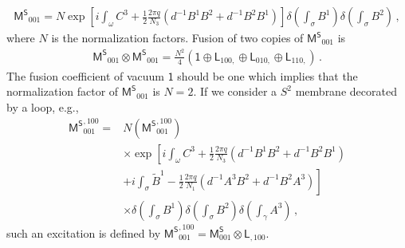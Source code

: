 \documentclass[11pt,nofootinbib,preprint]{revtex4-1}
\begin{document}
%
\begin{gather}
	\mathsf{M^S}_{001}=N\exp \left[ i\int_{\omega}{C^3+\frac{1}{2}\frac{2\pi q}{N_3}\left( d^{-1}B^1B^2+d^{-1}B^2B^1 \right)} \right] \delta \left( \int_{\sigma}{B^1} \right) \delta \left( \int_{\sigma}{B^2} \right) \,,
\end{gather}
where $N$ is the normalization factors. Fusion of two copies of $\mathsf{M^S}_{001}$ is 
\begin{align}
	{\mathsf{M}^{\mathsf{S}}}_{001}\otimes {\mathsf{M}^{\mathsf{S}}}_{001}=\frac{N^2}{4} \left( \mathsf{1}\oplus \mathsf{L}_{100,}\oplus \mathsf{L}_{010,}\oplus \mathsf{L}_{110,} \right) \,.
\end{align}
The fusion coefficient of vacuum $\mathsf{1}$ should be one which implies that the normalization factor of $\mathsf{M^S}_{001}$ is $N=2$. 
If we consider a $S^{2}$ membrane decorated by a loop, e.g., 
\begin{align}
	\mathsf{M^{S}}_{001}^{,100}= & N\left(\mathsf{M^{S}}_{001}^{,100}\right)\nonumber \\
	& \times\exp\left[i\int_{\omega}C^{3}+\frac{1}{2}\frac{2\pi q}{N_{3}}\left(d^{-1}B^{1}B^{2}+d^{-1}B^{2}B^{1}\right)\right.\nonumber \\
	& \left.+i\int_{\sigma}\widetilde{B}^{1}-\frac{1}{2}\frac{2\pi q}{N_{1}}\left(d^{-1}A^{3}B^{2}+d^{-1}B^{2}A^{3}\right)\right]\nonumber \\
	& \times\delta\left(\int_{\sigma}B^{1}\right)\delta\left(\int_{\sigma}B^{2}\right)\delta\left(\int_{\gamma}A^{3}\right)\,,
\end{align}
such an excitation is defined by $\mathsf{M^{S}}_{001}^{,100}=\mathsf{M}_{001}^{\mathsf{S}}\otimes\mathsf{L}_{,100}$.
\end{document}
